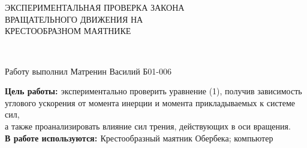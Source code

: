 {} \\[0.2cm]

 \\[0.4 cm]

{\bf{\Large
\begin{center}
{\noindent ЭКСПЕРИМЕНТАЛЬНАЯ ПРОВЕРКА ЗАКОНА\\ ВРАЩАТЕЛЬНОГО ДВИЖЕНИЯ НА\\ КРЕСТООБРАЗНОМ МАЯТНИКЕ}
\end{center}}} \\[0.1cm]

{\begin{center}\Large{Работу выполнил Матренин Василий Б01-006 \\[0.8cm]}\end{center}}

{\bf{\noindent Цель работы: }}  экспериментально проверить уравнение (1), получив зависимость\\ углового ускорения от момента инерции и момента прикладываемых к системе сил,\\ а также проанализировать влияние сил трения, действующих в оси вращения. \\[0.4cm]

{\bf{\noindent В работе используются: }} Крестообразный маятник Обербека; компьютер \\[0.4cm]

\newpage